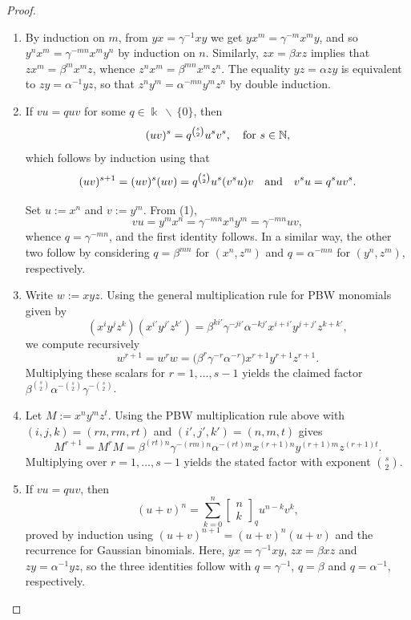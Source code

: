\documentclass{amsart}
\theoremstyle{definition}
\theoremstyle{remark}
\numberwithin{equation}{section}
\begin{document}
\begin{proof}
\begin{enumerate}
\item [\rm (1)] By induction on $m$, from $yx = \gamma^{-1}xy$ we get $y x^m = \gamma^{-m}x^m y$,  and so $y^n x^m = \gamma^{-mn}x^m y^n$ by induction on $n$. Similarly, $zx = \beta xz$ implies that $z x^m = \beta^m x^m z$, whence $z^n x^m=\beta^{mn}x^m z^n$. The equality $yz = \alpha zy$ is equivalent to $zy = \alpha^{-1}yz$, so that $z^n y^m = \alpha^{-mn}y^m z^n$ by double induction.

\item [\rm (2)] If $vu = quv$ for some $q\in\Bbbk\ \backslash \ \{0\}$, then
\[
(uv)^s = q^{\binom{s}{2}}u^s v^s, \quad  {\rm for}\, \, s\in\mathbb{N},
\]
which follows by induction using that
$$
(uv)^{s+1} = (uv)^s(uv)=q^{\binom{s}{2}}u^s(v^s u)v \quad {\rm and} \quad v^s u = q^s u v^s.
$$

Set $u := x^n$ and $v := y^m$. From {\rm (1)}, 
$$
v u = y^m x^n = \gamma^{-mn}x^n y^m=\gamma^{-mn} u v,
$$
whence $q = \gamma^{-mn}$, and the first identity follows. In a similar way, the other two follow by considering $q = \beta^{mn}$ for $(x^n,z^m)$ and $q=\alpha^{-mn}$ for $(y^n,z^m)$, respectively.

\item [\rm (3)] Write $w:=xyz$. Using the general multiplication rule for PBW monomials given by 
\[
(x^i y^j z^k)(x^{i'} y^{j'} z^{k'})
=\beta^{k i'}\gamma^{-j i'}\alpha^{-k j'}x^{i+i'}y^{j+j'}z^{k+k'},
\]
we compute recursively
\[
w^{r+1}=w^r w
=\big(\beta^{r}\gamma^{-r}\alpha^{-r}\big)x^{r+1}y^{r+1}z^{r+1}.
\]
Multiplying these scalars for $r=1,\dots,s-1$ yields the claimed factor
$\beta^{\binom{s}{2}}\alpha^{-\binom{s}{2}}\gamma^{-\binom{s}{2}}$.

\item [\rm (4)] Let $M:=x^n y^m z^t$. Using the PBW multiplication rule above with
$(i,j,k)=(rn,rm,rt)$ and $(i',j',k')=(n,m,t)$ gives
\[
M^{r+1}=M^r M
=\beta^{(rt)n}\gamma^{-(rm)n}\alpha^{-(rt)m}x^{(r+1)n}y^{(r+1)m}z^{(r+1)t}.
\]
Multiplying over $r=1,\dots,s-1$ yields the stated factor with exponent $\binom{s}{2}$.

\item [\rm (5)] If $vu=quv$, then
\[
(u+v)^n=\sum_{k=0}^n \begin{bmatrix} n\\ k\end{bmatrix}_{q}u^{n-k}v^k,
\]
proved by induction using $(u+v)^{n+1}=(u+v)^n(u+v)$ and the recurrence for Gaussian binomials.
Here, $yx = \gamma^{-1}xy$, $zx = \beta xz$ and $zy = \alpha^{-1}yz$, so the three identities follow with
$q=\gamma^{-1}$, $q=\beta$ and $q=\alpha^{-1}$, respectively.
\end{enumerate}
\end{proof}
\end{document}
